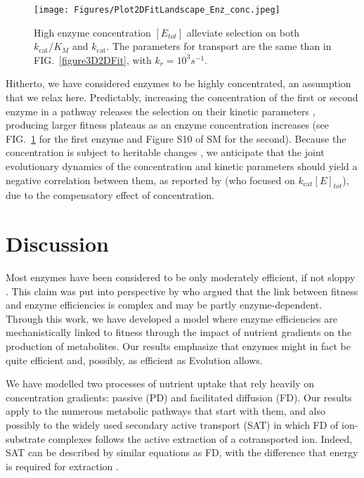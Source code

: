 \documentclass[11pt,onecolumn]{article}
\begin{document}
\begin{figure}[t!]
\centering
\texttt{[image: Figures/Plot2DFitLandscape\_Enz\_conc.jpeg]} 
\vspace{-0.3cm}
\caption{High enzyme concentration $[E_{tot}]$ alleviate selection on both $k_\text{cat}/K_M$ and $k_\text{cat}$. The parameters for transport are the same than in FIG.~\ref{figure3D2DFit}, with $k_r=10^3s^{-1}$.}
\label{figure2DEnzconc}
\end{figure}

Hitherto, we have considered enzymes to be highly concentrated, an assumption that we relax here. Predictably, increasing the concentration of the first or second enzyme in a pathway releases the selection on their kinetic parameters \citep{Noor16}, producing larger fitness plateaus as an enzyme concentration increases (see FIG.~\ref{figure2DEnzconc} for the first enzyme and Figure S10 of SM for the second). Because the concentration is subject to heritable changes \citep{Schaefke13}, we anticipate that the joint evolutionary dynamics of the concentration and kinetic parameters should yield a negative correlation between them, as reported by \citet{Davidi16,Davidi18} (who focused on $k_\text{cat}[E]_{tot}$), due to the compensatory effect of concentration.

\section{Discussion\label{sec:Discussion}}

Most enzymes have been considered to be only moderately efficient, if not sloppy \citep{Bar-Even11,Bar-Even15}. This claim was put into perspective by \citet{Newton18} who argued that the link between fitness and enzyme efficiencies is complex and may be partly enzyme-dependent. Through this work, we have developed a model where enzyme efficiencies are mechanistically linked to fitness through the impact of nutrient gradients on the production of metabolites. Our results emphasize that enzymes might in fact be quite efficient and, possibly, as efficient as Evolution allows. 

We have modelled two processes of nutrient uptake that rely heavily on concentration gradients: passive (PD) and facilitated diffusion (FD). Our results apply to the numerous metabolic pathways that start with them, and also possibly to the widely used secondary active transport (SAT) in which FD of ion-substrate complexes follows the active extraction of a cotransported ion. Indeed, SAT can be described by similar equations as FD, with the difference that energy is required for extraction \citep{Stein86e}.
\end{document}

